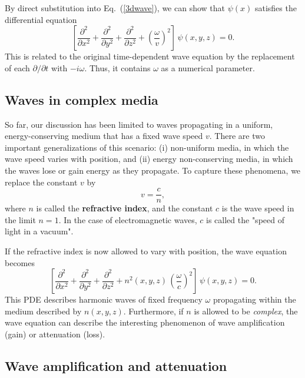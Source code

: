 \documentclass[10pt,a4paper]{article}
\begin{document}
By direct substitution into Eq.~(\ref{3dwave}), we can show that
$\psi(x)$ satisfies the differential equation
\begin{equation}
  \left[\frac{\partial^2}{\partial x^2} + \frac{\partial^2}{\partial y^2}
    + \frac{\partial^2}{\partial z^2}
    + \left(\frac{\omega}{v}\right)^2\right] \, \psi(x,y,z) = 0.
\end{equation}
This is related to the original time-dependent wave equation by the
replacement of each $\partial/\partial t$ with $-i\omega$. Thus, it
contains $\omega$ as a numerical parameter.

\subsection{Waves in complex media}

So far, our discussion has been limited to waves propagating in a
uniform, energy-conserving medium that has a fixed wave speed
$v$. There are two important generalizations of this scenario: (i)
non-uniform media, in which the wave speed varies with position, and
(ii) energy non-conserving media, in which the waves lose or gain
energy as they propagate.  To capture these phenomena, we replace the
constant $v$ by
\begin{equation}
  v = \frac{c}{n},
\end{equation}
where $n$ is called the \textbf{refractive index}, and the constant
$c$ is the wave speed in the limit $n = 1$.  In the case of
electromagnetic waves, $c$ is called the "speed of light in a vacuum".

If the refractive index is now allowed to vary with position, the wave
equation becomes
\begin{equation}
  \left[\frac{\partial^2}{\partial x^2}
    + \frac{\partial^2}{\partial y^2}
    + \frac{\partial^2}{\partial z^2}
    + n^2(x,y,z)\, \left(\frac{\omega}{c}\right)^2\right]
  \, \psi(x,y,z) = 0.
\end{equation}
This PDE describes harmonic waves of fixed frequency $\omega$
propagating within the medium described by $n(x,y,z)$.  Furthermore,
if $n$ is allowed to be \emph{complex}, the wave equation can describe
the interesting phenomenon of wave amplification (gain) or attenuation
(loss).

\subsection{Wave amplification and attenuation}
\label{gainloss}
\end{document}
